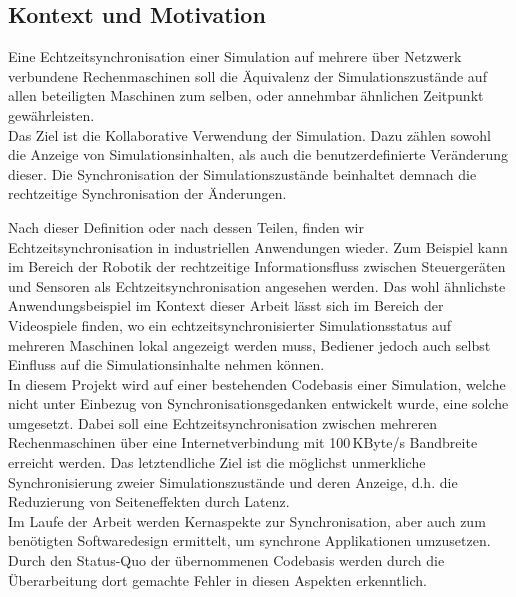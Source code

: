 

\subsection{Kontext und Motivation}
Eine Echtzeitsynchronisation einer Simulation auf mehrere über Netzwerk verbundene Rechenmaschinen soll die Äquivalenz der Simulationszustände auf allen beteiligten Maschinen zum selben, oder annehmbar ähnlichen Zeitpunkt gewährleisten.\\
Das Ziel ist die Kollaborative Verwendung der Simulation. 
Dazu zählen sowohl die Anzeige von Simulationsinhalten, als auch
die benutzerdefinierte Veränderung dieser. 
Die Synchronisation der Simulationszustände beinhaltet demnach die rechtzeitige Synchronisation der Änderungen.

Nach dieser Definition oder nach dessen Teilen, finden wir Echtzeitsynchronisation in industriellen Anwendungen wieder. Zum Beispiel kann im Bereich der Robotik der rechtzeitige Informationsfluss zwischen Steuergeräten und Sensoren als Echtzeitsynchronisation angesehen werden.
Das wohl ähnlichste Anwendungsbeispiel im Kontext dieser Arbeit lässt sich im Bereich der Videospiele finden, wo ein echtzeitsynchronisierter Simulationsstatus auf mehreren Maschinen lokal angezeigt werden muss, Bediener jedoch auch selbst Einfluss auf die Simulationsinhalte nehmen können.\\
In diesem Projekt wird auf einer bestehenden Codebasis einer Simulation, welche nicht unter Einbezug von Synchronisationsgedanken entwickelt wurde, eine solche umgesetzt. Dabei soll eine Echtzeitsynchronisation zwischen mehreren Rechenmaschinen über eine Internetverbindung mit 100\,KByte/s Bandbreite erreicht werden.
Das letztendliche Ziel ist die möglichst unmerkliche Synchronisierung zweier Simulationszustände und deren Anzeige, d.h. die Reduzierung von Seiteneffekten durch Latenz.\\
Im Laufe der Arbeit werden Kernaspekte zur Synchronisation, aber auch zum benötigten Softwaredesign ermittelt, um synchrone Applikationen umzusetzen. Durch den Status-Quo der übernommenen Codebasis werden durch die Überarbeitung dort gemachte Fehler in diesen Aspekten erkenntlich.

